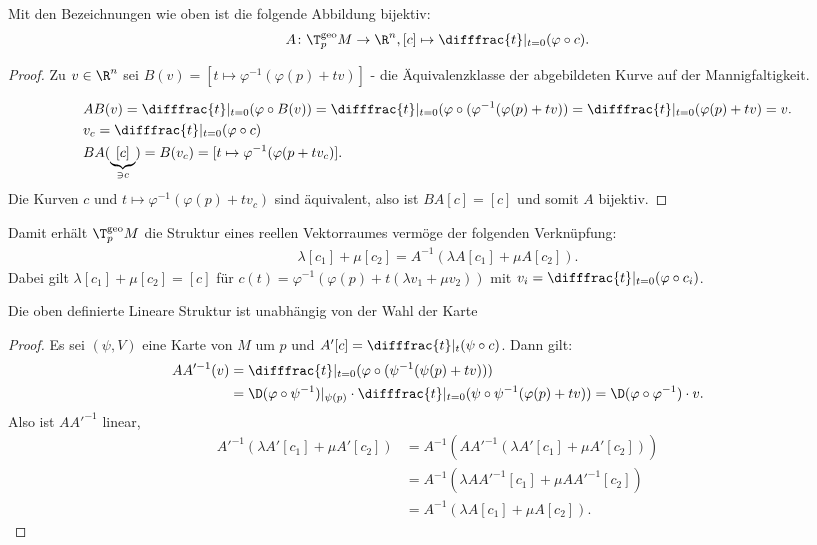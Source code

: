 \begin{bem}
  Mit den Bezeichnungen wie oben ist die folgende Abbildung bijektiv:
  \begin{align*}
    A \colon \T_p^{\text{geo}}M \to \R^n, [c] \mapsto \difffrac{t}|_{t=0}(\varphi \circ c).
  \end{align*}
\end{bem}

\begin{proof}
  Zu $v \in \R^n$ sei $B(v) = [t \mapsto \varphi^{-1}(\varphi(p) + tv)]$ - die Äquivalenzklasse der abgebildeten Kurve auf der Mannigfaltigkeit.


  \begin{align*}
    & A B(v) = \difffrac{t}|_{t=0}(\varphi \circ B(v)) = \difffrac{t}|_{t=0}(\varphi \circ (\varphi^{-1}(\varphi(p) + tv)) = \difffrac{t}|_{t=0}(\varphi(p) + tv) = v.\\
    & v_c = \difffrac{t}|_{t=0}(\varphi \circ c)\\
    & B A (\underbrace{[c]}_{\ni c}) = B(v_c) = [t \mapsto \varphi^{-1}(\varphi(p + tv_c)].
  \end{align*}
  Die Kurven $c$ und $t \mapsto \varphi^{-1}(\varphi(p) + tv_c)$ sind äquivalent, also ist $B A[c] = [c]$ und somit $A$ bijektiv.
\end{proof}

Damit erhält $\T_p^{\text{geo}}M$ die Struktur eines reellen Vektorraumes vermöge der folgenden Verknüpfung:
\begin{align*}
  \lambda[c_1] + \mu[c_2] = A^{-1}(\lambda A[c_1]+ \mu A[c_2]).
\end{align*}
Dabei gilt $\lambda[c_1]+\mu[c_2] = [c]$ für $c(t) = \varphi^{-1}(\varphi(p) + t(\lambda v_1 + \mu v_2))$ mit $v_i = \difffrac{t}|_{t=0}(\varphi \circ c_i)$.

\begin{lemma}
  Die oben definierte Lineare Struktur ist unabhängig von der Wahl der Karte
\end{lemma}

\begin{proof}
  Es sei $(\psi, V)$ eine Karte von $M$ um $p$ und $A'[c] = \difffrac{t}|_t(\psi \circ c)$. Dann gilt:
  \begin{align*}
    A A'^{-1}(v) & = \difffrac{t}|_{t=0}(\varphi \circ (\psi^{-1} (\psi(p) + tv)))\\
    & = \D(\varphi \circ \psi^{-1})|_{\psi(p)} \cdot \difffrac{t}|_{t=0}(\psi \circ \psi^{-1}(\varphi(p) + tv)) = \D (\varphi \circ \varphi^{-1}) \cdot v.
  \end{align*}
  Also ist $A A'^{-1}$ linear,
  \begin{align*}
    A'^{-1}(\lambda A'[c_1] + \mu A'[c_2]) & = A^{-1}(A A'^{-1}(\lambda A'[c_1] + \mu A'[c_2]))\\
    & = A^{-1} (\lambda A A'^{-1}[c_1] + \mu A A'^{-1} [c_2])\\
    & = A^{-1}(\lambda A [c_1] + \mu A [c_2]).
  \end{align*}
\end{proof}


